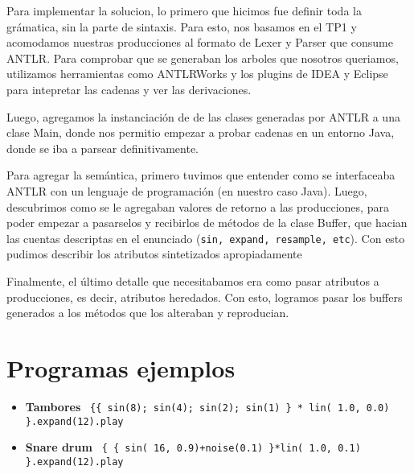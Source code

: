 \documentclass[a4paper]{article}
\begin{document}
Para implementar la solucion, lo primero que hicimos fue definir toda la
gr\'amatica, sin la parte de sintaxis. Para esto, nos basamos en el TP1 y
acomodamos nuestras producciones al formato de Lexer y Parser que consume ANTLR.
Para comprobar que se generaban los arboles que nosotros queriamos, utilizamos
herramientas como ANTLRWorks y los plugins de IDEA y Eclipse para intepretar 
las cadenas y ver las derivaciones. 

Luego, agregamos la instanciaci\'on de de las clases generadas por ANTLR
a una clase Main, donde nos permitio empezar a probar cadenas en un 
entorno Java, donde se iba a parsear definitivamente.

Para agregar la sem\'antica, primero tuvimos que entender como se interfaceaba
ANTLR con un lenguaje de programaci\'on (en nuestro caso Java). Luego, descubrimos
como se le agregaban valores de retorno a las producciones, para poder empezar
a pasarselos y recibirlos de m\'etodos de la clase Buffer, que hacian las cuentas
descriptas en el enunciado (\texttt{sin, expand, resample, etc}). Con esto
pudimos describir los atributos sintetizados apropiadamente

Finalmente, el \'ultimo detalle que necesitabamos era como pasar atributos a
producciones, es decir, atributos heredados. Con esto, logramos pasar
los buffers generados a los m\'etodos que los alteraban y reproducian.

\section{Programas ejemplos}
\begin{itemize}
    \item \textbf{Tambores} \texttt{ \{\{ sin(8); sin(4); sin(2); sin(1) \} * lin( 1.0, 0.0) \}.expand(12).play }
    \item \textbf{Snare drum} \texttt{ \{ \{ sin( 16, 0.9)+noise(0.1) \}*lin( 1.0, 0.1) \}.expand(12).play  }
\end{itemize}
\end{document}
